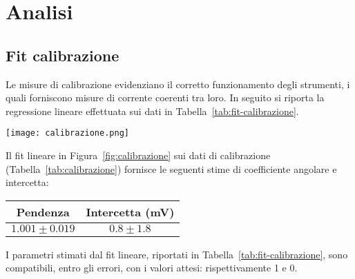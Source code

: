\documentclass[@SRC@/main]{subfiles}
\begin{document}
\vspace{1.5 pt}
\clearpage


\section{Analisi}

  \subsection{Fit calibrazione}
    Le misure di calibrazione evidenziano il corretto funzionamento degli
    strumenti, i quali forniscono misure di corrente coerenti tra loro. In seguito
    si riporta la regressione lineare effettuata sui dati in Tabella~\ref{tab:fit-calibrazione}.
    \vspace{0.75cm}
    \begin{center}
      \begin{minipage}{.8\textwidth}
        \centering
        \texttt{[image: calibrazione.png]}
        \label{fig:calibrazione}
      \end{minipage}
    \end{center}

    \vspace{5pt}
    \noindent Il fit lineare in Figura~\ref{fig:calibrazione} sui dati
    di calibrazione (Tabella~\ref{tab:calibrazione}) fornisce le seguenti
    stime di coefficiente angolare e intercetta:

    \vspace{0.25cm}
    \begin{center}
      \begin{minipage}{.95\textwidth}
        \centering
        \begin{tabular}{||c|c||}
          \hline
          Pendenza          & Intercetta (mV) \\
          \hline
          $1.001 \pm 0.019$ & $0.8 \pm 1.8$   \\
          \hline
        \end{tabular}
        \label{tab:fit-calibrazione}
      \end{minipage}
    \end{center}
    \vspace{0.25cm}
    I parametri stimati dal fit lineare, riportati in Tabella~\ref{tab:fit-calibrazione},
    sono compatibili, entro gli errori, con i valori attesi: rispettivamente 1 e 0.
    \vspace{0.1cm}
\end{document}
